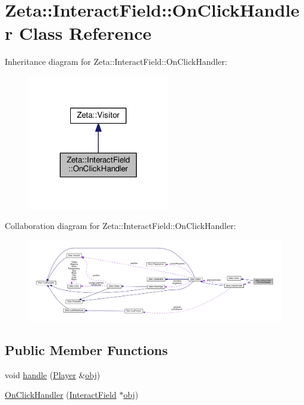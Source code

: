 \hypertarget{classZeta_1_1InteractField_1_1OnClickHandler}{\section{Zeta\+:\+:Interact\+Field\+:\+:On\+Click\+Handler Class Reference}
\label{classZeta_1_1InteractField_1_1OnClickHandler}
}


Inheritance diagram for Zeta\+:\+:Interact\+Field\+:\+:On\+Click\+Handler\+:\nopagebreak
\begin{figure}[H]
\begin{center}
\leavevmode
\includegraphics[width=176pt]{classZeta_1_1InteractField_1_1OnClickHandler__inherit__graph}
\end{center}
\end{figure}


Collaboration diagram for Zeta\+:\+:Interact\+Field\+:\+:On\+Click\+Handler\+:\nopagebreak
\begin{figure}[H]
\begin{center}
\leavevmode
\includegraphics[width=350pt]{classZeta_1_1InteractField_1_1OnClickHandler__coll__graph}
\end{center}
\end{figure}
\subsection*{Public Member Functions}
\begin{DoxyCompactItemize}
\item 
void \hyperlink{classZeta_1_1InteractField_1_1OnClickHandler_a53292f10b7796158b22e0d116f5631a7}{handle} (\hyperlink{classZeta_1_1Player}{Player} \&\hyperlink{classZeta_1_1InteractField_1_1OnClickHandler_a3e784e284713db71a1d20090231f73d1}{obj})
\item 
\hyperlink{classZeta_1_1InteractField_1_1OnClickHandler_a5f51d901bb2eb9fd3ec8260bc4a05f6e}{On\+Click\+Handler} (\hyperlink{classZeta_1_1InteractField}{Interact\+Field} $\ast$\hyperlink{classZeta_1_1InteractField_1_1OnClickHandler_a3e784e284713db71a1d20090231f73d1}{obj})
\end{DoxyCompactItemize}
